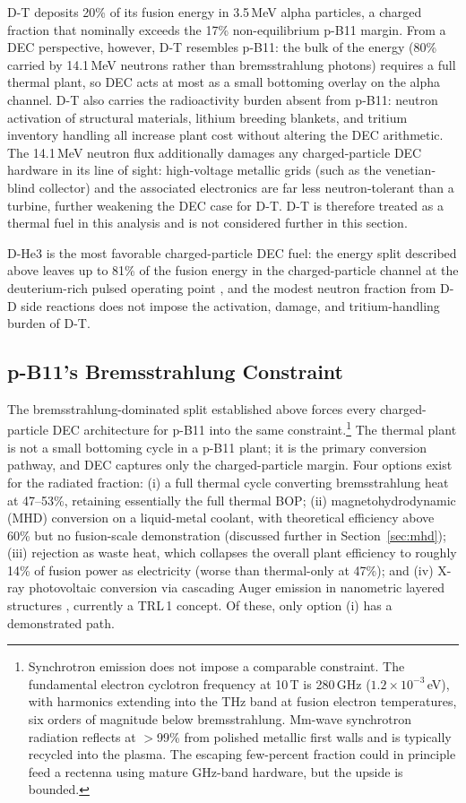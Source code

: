 \documentclass{article}
\begin{document}
D-T deposits 20\% of its fusion energy in 3.5\,MeV alpha particles,
a charged fraction that nominally exceeds the 17\% non-equilibrium
p-B11 margin. From a DEC perspective, however, D-T resembles p-B11:
the bulk of the energy (80\% carried by 14.1\,MeV neutrons rather
than bremsstrahlung photons) requires a full thermal plant, so DEC
acts at most as a small bottoming overlay on the alpha channel. D-T
also carries the radioactivity burden absent from p-B11: neutron
activation of structural materials, lithium breeding blankets, and
tritium inventory handling all increase plant cost without altering
the DEC arithmetic. The 14.1\,MeV neutron flux additionally damages
any charged-particle DEC hardware in its line of sight: high-voltage
metallic grids (such as the venetian-blind collector) and the
associated electronics are far less neutron-tolerant than a turbine,
further weakening the DEC case for D-T. D-T is therefore treated as a thermal fuel in
this analysis and is not considered further in this section.

D-He3 is the most favorable charged-particle DEC fuel: the energy
split described above leaves up to 81\% of the fusion energy in the
charged-particle channel at the deuterium-rich pulsed operating
point \citep{Wesson2004}, and the modest neutron fraction from D-D
side reactions does not impose the activation, damage, and
tritium-handling burden of D-T.

\subsection{p-B11's Bremsstrahlung Constraint}
\label{sec:brem}

The bremsstrahlung-dominated split established above forces every
charged-particle DEC architecture for p-B11 into the same
constraint.\footnote{Synchrotron emission does not impose a
comparable constraint. The fundamental electron cyclotron frequency
at 10\,T is 280\,GHz ($1.2 \times 10^{-3}$\,eV), with harmonics
extending into the THz band at fusion electron temperatures, six
orders of magnitude below bremsstrahlung. Mm-wave synchrotron
radiation reflects at $>$99\% from polished metallic first walls
and is typically recycled into the plasma. The escaping
few-percent fraction could in principle feed a rectenna using
mature GHz-band hardware, but the upside is bounded.} The thermal plant is not a small bottoming cycle in a
p-B11 plant; it is the primary conversion pathway, and DEC captures
only the charged-particle margin. Four options exist for the radiated fraction: (i) a full
thermal cycle converting bremsstrahlung heat at 47--53\%, retaining
essentially the full thermal BOP; (ii) magnetohydrodynamic (MHD)
conversion on a liquid-metal coolant, with theoretical efficiency
above 60\% but no fusion-scale demonstration \citep{Smolentsev2022}
(discussed further in Section~\ref{sec:mhd});
(iii) rejection as waste heat, which collapses the overall plant
efficiency to roughly 14\% of fusion power as electricity (worse
than thermal-only at 47\%); and (iv) X-ray photovoltaic conversion
via cascading Auger emission in nanometric layered structures
\citep{Binderbauer2018}, currently a TRL\,1 concept. Of these, only
option (i) has a demonstrated path.
\end{document}
